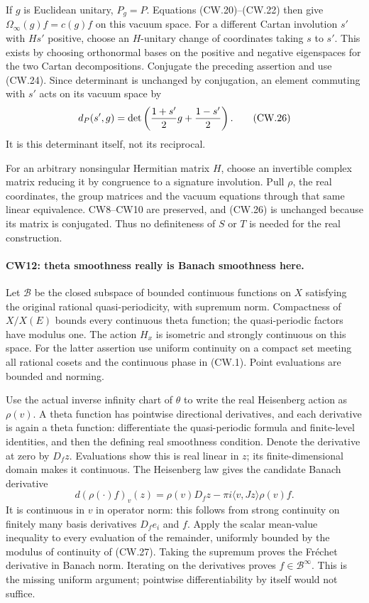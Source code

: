 If $g$ is Euclidean unitary, $P_g=P$.  Equations (CW.20)--(CW.22)
then give $\Omega_\infty(g)f=c(g)f$ on this vacuum space.
For a different Cartan involution $s'$ with $Hs'$ positive,
choose an $H$-unitary change of coordinates taking $s$ to $s'$.
This exists by choosing orthonormal bases on the positive and
negative eigenspaces for the two Cartan decompositions.  Conjugate
the preceding assertion and use (CW.24).  Since determinant is
unchanged by conjugation, an element commuting with $s'$ acts
on its vacuum space by
\[
             d_P(s',g)=\det\left({1+s'\over2}g
                                      +{1-s'\over2}\right).
                                                               \tag{CW.26}
\]
It is this determinant itself, not its reciprocal.

For an arbitrary nonsingular Hermitian matrix $H$, choose an
invertible complex matrix reducing it by congruence to a signature
involution.  Pull $\rho$, the real coordinates, the group matrices
and the vacuum equations through that same linear equivalence.
CW8--CW10 are preserved, and (CW.26) is unchanged because its
matrix is conjugated.  Thus no definiteness of $S$ or $T$ is
needed for the real construction.

\paragraph{CW12: theta smoothness really is Banach smoothness here.}
Let $\mathcal B$ be the closed subspace of bounded continuous
functions on $X$ satisfying the original rational quasi-periodicity,
with supremum norm.  Compactness of $X/X(E)$ bounds every continuous
theta function; the quasi-periodic factors have modulus one.
The action $H_x$ is isometric and strongly continuous on this space.
For the latter assertion use uniform continuity on a compact set
meeting all rational cosets and the continuous phase in (CW.1).
Point evaluations are bounded and norming.

Use the actual inverse infinity chart of $\theta$ to write the
real Heisenberg action as $\rho(v)$.  A theta function has pointwise
directional derivatives, and each derivative is again a theta
function: differentiate the quasi-periodic formula and finite-level
identities, and then the defining real smoothness condition.
Denote the derivative at zero by $D_fz$.  Evaluations show this
is real linear in $z$; its finite-dimensional domain makes it
continuous.  The Heisenberg law gives the candidate Banach derivative
\[
 d(\rho(\cdot)f)_v(z)=\rho(v)D_fz
                         -\pi i\langle v,Jz\rangle\rho(v)f.
                                                               \tag{CW.27}
\]
It is continuous in $v$ in operator norm: this follows from strong
continuity on finitely many basis derivatives $D_fe_i$ and $f$.
Apply the scalar mean-value inequality to every evaluation of the
remainder, uniformly bounded by the modulus of continuity of
(CW.27).  Taking the supremum proves the Fr\'echet derivative in
Banach norm.  Iterating on the derivatives proves
$f\in\mathcal B^\infty$.  This is the missing uniform argument;
pointwise differentiability by itself would not suffice.

